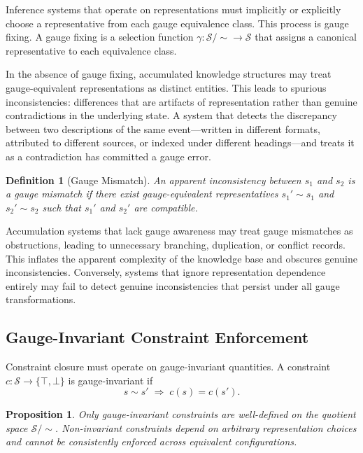 \documentclass[12pt, oneside]{article}
\newtheorem{definition}{Definition}
\newtheorem{proposition}{Proposition}
\begin{document}
Inference systems that operate on representations must implicitly or explicitly choose a representative from each gauge equivalence class. This process is gauge fixing. A gauge fixing is a selection function $\gamma : \mathcal{S}/{\sim} \to \mathcal{S}$ that assigns a canonical representative to each equivalence class.

In the absence of gauge fixing, accumulated knowledge structures may treat gauge-equivalent representations as distinct entities. This leads to spurious inconsistencies: differences that are artifacts of representation rather than genuine contradictions in the underlying state. A system that detects the discrepancy between two descriptions of the same event---written in different formats, attributed to different sources, or indexed under different headings---and treats it as a contradiction has committed a gauge error.

\begin{definition}[Gauge Mismatch]
An apparent inconsistency between $s_1$ and $s_2$ is a gauge mismatch if there exist gauge-equivalent representatives $s_1' \sim s_1$ and $s_2' \sim s_2$ such that $s_1'$ and $s_2'$ are compatible.
\end{definition}

Accumulation systems that lack gauge awareness may treat gauge mismatches as obstructions, leading to unnecessary branching, duplication, or conflict records. This inflates the apparent complexity of the knowledge base and obscures genuine inconsistencies. Conversely, systems that ignore representation dependence entirely may fail to detect genuine inconsistencies that persist under all gauge transformations.

\subsection{Gauge-Invariant Constraint Enforcement}

Constraint closure must operate on gauge-invariant quantities. A constraint $c : \mathcal{S} \to \{\top, \bot\}$ is gauge-invariant if
\begin{equation}
  s \sim s' \;\Rightarrow\; c(s) = c(s').
\end{equation}

\begin{proposition}
Only gauge-invariant constraints are well-defined on the quotient space $\mathcal{S}/{\sim}$. Non-invariant constraints depend on arbitrary representation choices and cannot be consistently enforced across equivalent configurations.
\end{proposition}
\end{document}
